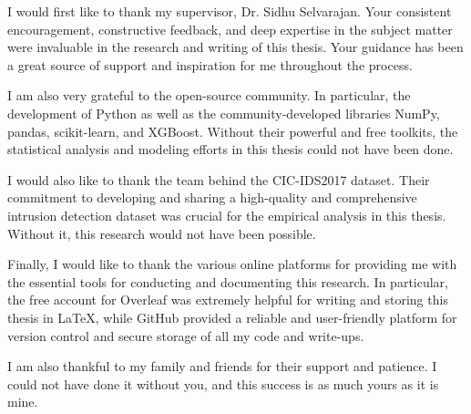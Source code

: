I would first like to thank my supervisor, Dr. Sidhu Selvarajan. Your consistent encouragement, constructive feedback, and deep expertise in the subject matter were invaluable in the research and writing of this thesis. Your guidance has been a great source of support and inspiration for me throughout the process. 

I am also very grateful to the open-source community. In particular, the development of Python as well as the community-developed libraries NumPy, pandas, scikit-learn, and XGBoost. Without their powerful and free toolkits, the statistical analysis and modeling efforts in this thesis could not have been done.

 I would also like to thank the team behind the CIC-IDS2017 dataset. Their commitment to developing and sharing a high-quality and comprehensive intrusion detection dataset was crucial for the empirical analysis in this thesis. Without it, this research would not have been possible. 
 
 Finally, I would like to thank the various online platforms for providing me with the essential tools for conducting and documenting this research. In particular, the free account for Overleaf was extremely helpful for writing and storing this thesis in \LaTeX, while GitHub provided a reliable and user-friendly platform for version control and secure storage of all my code and write-ups. 
 
 I am also thankful to my family and friends for their support and patience. I could not have done it without you, and this success is as much yours as it is mine.
